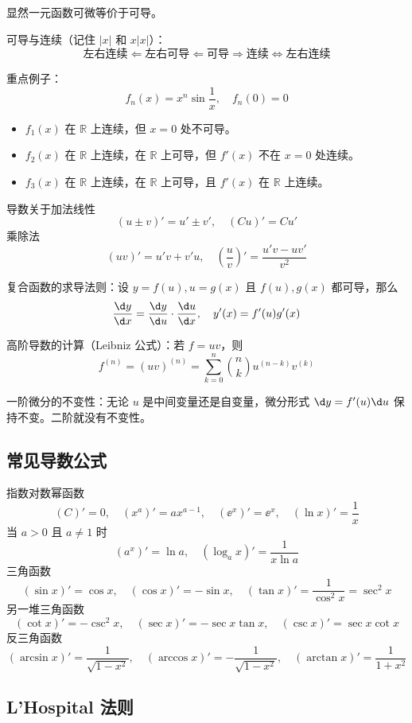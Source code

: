 显然一元函数可微等价于可导。

可导与连续（记住 $|x|$ 和 $x|x|$）：
\[ \text{左右连续} \Leftarrow \text{左右可导}  \Leftarrow \text{可导}  \Rightarrow \text{连续} \Leftrightarrow \text{左右连续} \]

重点例子：
\[ f_n(x) = x^n \sin \frac{1}{x}, \quad f_n(0) = 0 \]
\begin{itemize}
	\item $f_1(x)$ 在 $\mathbb{R}$ 上连续，但 $x=0$ 处不可导。
	\item $f_2(x)$ 在 $\mathbb{R}$ 上连续，在 $\mathbb{R}$ 上可导，但 $f'(x)$ 不在 $x=0$ 处连续。
	\item $f_3(x)$ 在 $\mathbb{R}$ 上连续，在 $\mathbb{R}$ 上可导，且 $f'(x)$ 在 $\mathbb{R}$ 上连续。
\end{itemize}

导数关于加法线性
\[ (u \pm v)' = u' \pm v', \quad  (Cu)' = Cu' \]
乘除法
\[ (uv)' = u'v + v'u, \quad \left(\frac{u}{v}\right)' = \frac{u'v - uv'}{v^2} \]

复合函数的求导法则：设 $y = f(u), u = g(x)$ 且 $f(u), g(x)$ 都可导，那么
\[ \frac{\d y}{\d x} = \frac{\d y}{\d u} \cdot \frac{\d u}{\d x}, \quad y'(x) = f'(u) g'(x) \]

高阶导数的计算（Leibniz 公式）：若 $f = uv$，则
\[ f^{(n)} = (uv)^{(n)} = \sum_{k=0}^{n} \binom{n}{k} u^{(n-k)}v^{(k)} \]

一阶微分的不变性：无论 $u$ 是中间变量还是自变量，微分形式 $\d y = f'(u) \d u$ 保持不变。二阶就没有不变性。

\subsection{常见导数公式}

指数对数幂函数
\[  (C)' = 0, \quad \left(x^a\right)' = a x^{a-1}, \quad
	\left(\ee^x\right)' = \ee^x, \quad
	\left(\ln x\right)' = \frac{1}{x} \]
当 $a > 0$ 且 $a \neq 1$ 时
\[ \left(a^x\right)' = \ln a, \quad \left(\log_a x\right)' = \frac{1}{x \ln a}  \]
三角函数
\[ \left(\sin x\right)' = \cos x, \quad \left(\cos x\right)' = -\sin x, \quad \left(\tan x\right)' = \frac{1}{\cos^2 x} = \sec^2 x \]
另一堆三角函数
\[ \left(\cot x\right)' = -\csc^2 x, \quad \left(\sec x\right)' = -\sec x\tan x, \quad \left(\csc x\right)' = \sec x \cot x \]
反三角函数
\[
	\left(\arcsin x\right)' = \frac{1}{\sqrt{1-x^2}} , \quad
	\left(\arccos x\right)' = -\frac{1}{\sqrt{1-x^2}}, \quad
	\left(\arctan x\right)' = \frac{1}{1+x^2}
\]

\subsection{L'Hospital 法则}

